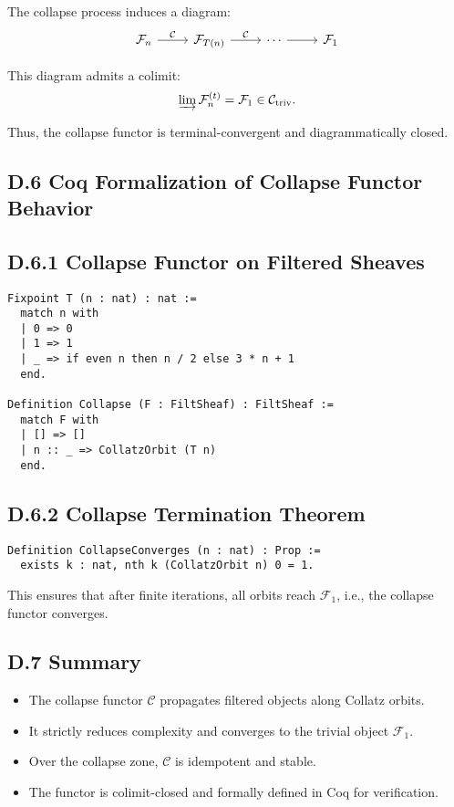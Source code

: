 \documentclass[11pt]{article}
\begin{document}
The collapse process induces a diagram:
\[
\begin{tikzcd}
\mathcal{F}_n \arrow[r, "\mathcal{C}"] & \mathcal{F}_{T(n)} \arrow[r, "\mathcal{C}"] & \cdots \arrow[r] & \mathcal{F}_1
\end{tikzcd}
\]

This diagram admits a colimit:
\[
\varinjlim \mathcal{F}_n^{(t)} = \mathcal{F}_1 \in \mathcal{C}_{\mathrm{triv}}.
\]

Thus, the collapse functor is terminal-convergent and diagrammatically closed.

\subsection*{D.6 Coq Formalization of Collapse Functor Behavior}

\subsection*{D.6.1 Collapse Functor on Filtered Sheaves}

\begin{lstlisting}[language=Coq]
Fixpoint T (n : nat) : nat :=
  match n with
  | 0 => 0
  | 1 => 1
  | _ => if even n then n / 2 else 3 * n + 1
  end.

Definition Collapse (F : FiltSheaf) : FiltSheaf :=
  match F with
  | [] => []
  | n :: _ => CollatzOrbit (T n)
  end.
\end{lstlisting}

\subsection*{D.6.2 Collapse Termination Theorem}

\begin{lstlisting}[language=Coq]
Definition CollapseConverges (n : nat) : Prop :=
  exists k : nat, nth k (CollatzOrbit n) 0 = 1.
\end{lstlisting}

This ensures that after finite iterations, all orbits reach \( \mathcal{F}_1 \), i.e., the collapse functor converges.

\subsection*{D.7 Summary}

\begin{itemize}
  \item The collapse functor \( \mathcal{C} \) propagates filtered objects along Collatz orbits.
  \item It strictly reduces complexity and converges to the trivial object \( \mathcal{F}_1 \).
  \item Over the collapse zone, \( \mathcal{C} \) is idempotent and stable.
  \item The functor is colimit-closed and formally defined in Coq for verification.
\end{itemize}
\end{document}
